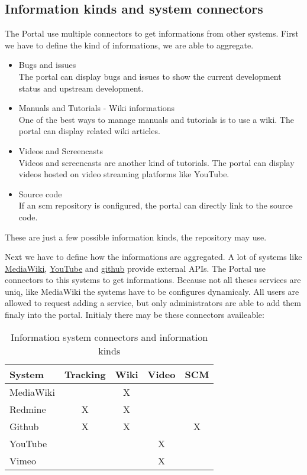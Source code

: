 \subsection[sec:information kinds and system connectors]{Information kinds and system connectors}

The Portal use multiple connectors to get informations from other systems.
First we have to define the kind of informations, we are able to aggregate.

\begin{itemize}
\item Bugs and issues\\
The portal can display bugs and issues to show the current development status and upstream development.
\item Manuals and Tutorials - Wiki informations\\
One of the best ways to manage manuals and tutorials is to use a wiki. The portal can display related wiki articles.
\item Videos and Screencasts\\
Videos and screencasts are another kind of tutorials. The portal can display videos hosted on video streaming platforms like YouTube.
\item Source code\\
If an scm repository is configured, the portal can directly link to the source code.
\end{itemize}

These are just a few possible information kinds, the repository may use.

Next we have to define how the informations are aggregated.
A lot of systems like \hyperlink{http://www.mediawiki.org/wiki/API:Main_page/de}{MediaWiki}, \hyperlink{http://code.google.com/intl/de-DE/apis/youtube/overview.html}{YouTube} and \hyperlink{http://developer.github.com/v3/}{github} provide external APIs.
The Portal use connectors to this systems to get informations.
Because not all theses services are uniq, like MediaWiki the systems have to be configures dynamicaly.
All users are allowed to request adding a service, but only administrators are able to add them finaly into the portal.
Initialy there may be these connectors availeable:

\small
\begin{longtable}{|p{}|c|c|c|c}
\caption{Information system connectors and information kinds} \\
\hline
\label{tab:versioncompatexamples}
\textbf{System} & \textbf{Tracking} & \textbf{Wiki} & \textbf{Video} & \textbf{SCM}
\\ \hline
 MediaWiki & & X & &
\\ \hline
 Redmine & X & X & &
\\ \hline
 Github & X & X & & X
\\ \hline
 YouTube & & & X &
\\ \hline
 Vimeo & & & X &
\\ \hline
\end{longtable}
\normalsize
